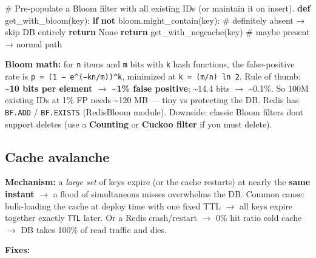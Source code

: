 \documentclass[11pt]{article}
\newenvironment{Shaded}{\begin{snugshade}}{\end{snugshade}}
\newcommand{\CommentTok}[1]{\textcolor[rgb]{0.48,0.49,0.49}{#1}}
\newcommand{\ControlFlowTok}[1]{\textcolor[rgb]{0.99,0.74,0.29}{\textbf{#1}}}
\newcommand{\KeywordTok}[1]{\textcolor[rgb]{0.81,0.81,0.76}{\textbf{#1}}}
\newcommand{\NormalTok}[1]{\textcolor[rgb]{0.81,0.81,0.76}{#1}}
\newcommand{\VariableTok}[1]{\textcolor[rgb]{0.15,0.68,0.68}{#1}}
\begin{document}

\begin{Shaded}
\begin{Highlighting}[]
\CommentTok{\# Pre{-}populate a Bloom filter with all existing IDs (or maintain it on insert).}
\KeywordTok{def}\NormalTok{ get\_with\_bloom(key):}
    \ControlFlowTok{if} \KeywordTok{not}\NormalTok{ bloom.might\_contain(key):     }\CommentTok{\# definitely absent → skip DB entirely}
        \ControlFlowTok{return} \VariableTok{None}
    \ControlFlowTok{return}\NormalTok{ get\_with\_negcache(key)        }\CommentTok{\# maybe present → normal path}
\end{Highlighting}
\end{Shaded}

\textbf{Bloom math:} for \texttt{n} items and \texttt{m} bits with \texttt{k} hash functions, the false-positive rate is \texttt{p\ ≈\ (1\ −\ e\^{}(−kn/m))\^{}k}, minimized at \texttt{k\ =\ (m/n)\ ln\ 2}. Rule of thumb: \textbf{\textasciitilde10 bits per element \(\rightarrow\) \textasciitilde1\% false positive}; \textasciitilde14.4 bits \(\rightarrow\) \textasciitilde0.1\%. So 100M existing IDs at 1\% FP needs \textasciitilde120 MB --- tiny vs protecting the DB. Redis has \texttt{BF.ADD} / \texttt{BF.EXISTS} (RedisBloom module). Downside: classic Bloom filters don\textquotesingle t support deletes (use a \textbf{Counting} or \textbf{Cuckoo filter} if you must delete).

\subsection{Cache avalanche}\label{cache-avalanche}

\textbf{Mechanism:} a \emph{large set} of keys expire (or the cache restarts) at nearly the \textbf{same instant} \(\rightarrow\) a flood of simultaneous misses overwhelms the DB. Common cause: bulk-loading the cache at deploy time with one fixed TTL \(\rightarrow\) all keys expire together exactly \texttt{TTL} later. Or a Redis crash/restart \(\rightarrow\) 0\% hit ratio cold cache \(\rightarrow\) DB takes 100\% of read traffic and dies.

\textbf{Fixes:}
\end{document}
